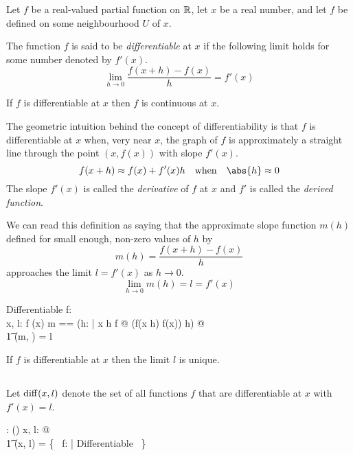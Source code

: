\documentclass{amsart}
\begin{document}
Let $f$ be a real-valued partial function on $\mathbb{R}$, let $x$ be a real number,
and let $f$ be defined on some neighbourhood $U$ of $x$.

The function $f$ is said to be {\it differentiable} at $x$ if the following limit holds for some number denoted by $f'(x)$.
$$
\lim_{h \to 0} \frac{f(x+h) - f(x)}{h} = f'(x)
$$

\begin{remark}
If $f$ is differentiable at $x$ then $f$ is continuous at $x$.
\end{remark}

The geometric intuition behind the concept of differentiability is that $f$ is differentiable at $x$
when, very near $x$, the graph of $f$ is approximately a straight line through the point $(x, f(x))$ with slope $f'(x)$.
$$
f(x + h) \approx f(x) + f'(x) h \quad \text{when} \quad \abs{h} \approx 0
$$
The slope $f'(x)$ is called the {\it derivative} of $f$ at $x$
and $f'$ is called the {\it derived function}.

We can read this definition as saying that the approximate slope function $m(h)$ defined for 
small enough, non-zero values of $h$ by
$$
	m(h) = \frac{f(x + h) - f(x)}{h}
$$
approaches the limit $l = f'(x)$ as $h \to 0$.
$$
	\lim_{h\to 0}{m(h)} = l = f'(x)
$$

\begin{schema}{Differentiable}
	f: \R \pfun \R \\
	x, l: \R
\where
	f \in \CzeroR(x)
\also
	\LET m == (\lambda h: \Rnz | x \addR h \in \dom f @ (f(x \addR h) \subR f(x)) \divR h) @ \\
	\t1	\limFR(m, \zeroR) = l
\end{schema}

\begin{remark}
If $f$ is differentiable at $x$ then the limit $l$ is unique.
\end{remark}

\subsection{}

Let $\operatorname{diff}(x,l)$ denote the set of all functions $f$ that are differentiable at $x$ with $f'(x) = l$.

\begin{axdef}
	\diffRR: \R \cross \R \fun \power(\R \pfun \R)
\where
	\forall x, l: \R @ \\
	\t1	\diffRR(x, l) = \{~ f: \R \pfun \R | Differentiable ~\}
\end{axdef}
\end{document}
